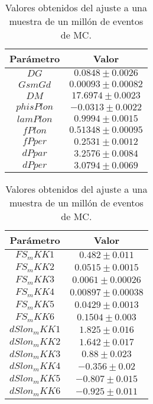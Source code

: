\begin{table}[H]
\centering
\begin{multicols}{2}
\begin{tabular}{cc}
\toprule
Parámetro & Valor \\ \midrule
$ DG          $&$ 0.0848 \pm 0.0026 $ \\
$ GsmGd       $&$0.00093 \pm 0.00082$ \\
$ DM          $&$ 17.6974 \pm 0.0023$ \\
$ phisPlon    $&$ -0.0313 \pm 0.0022$ \\
$ lamPlon     $&$ 0.9994 \pm 0.0015 $ \\
$ fPlon       $&$0.51348 \pm 0.00095$ \\
$ fPper       $&$ 0.2531 \pm 0.0012 $ \\
$ dPpar       $&$ 3.2576 \pm 0.0084 $ \\
$ dPper       $&$ 3.0794 \pm 0.0069 $ \\
\bottomrule
\end{tabular}
\begin{tabular}{cc}
\toprule
Parámetro & Valor \\ \midrule
$ FS_mKK1     $&$  0.482 \pm 0.011  $ \\
$ FS_mKK2     $&$ 0.0515 \pm 0.0015 $ \\
$ FS_mKK3     $&$ 0.0061 \pm 0.00026$ \\
$ FS_mKK4     $&$0.00897 \pm 0.00038$ \\
$ FS_mKK5     $&$ 0.0429 \pm 0.0013 $ \\
$ FS_mKK6     $&$  0.1504 \pm 0.003 $ \\
$ dSlon_mKK1  $&$  1.825 \pm 0.016  $ \\
$ dSlon_mKK2  $&$  1.642 \pm 0.017  $ \\
$ dSlon_mKK3  $&$   0.88 \pm 0.023  $ \\
$ dSlon_mKK4  $&$  -0.356 \pm 0.02  $ \\
$ dSlon_mKK5  $&$  -0.807 \pm 0.015 $ \\
$ dSlon_mKK6  $&$  -0.925 \pm 0.011 $ \\
\bottomrule
\end{tabular}
\end{multicols}
  \caption{Valores obtenidos del ajuste a una muestra de un millón de eventos  de MC.}
\end{table}

